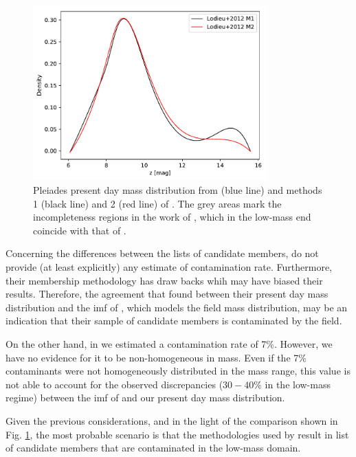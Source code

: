 \begin{figure}[ht!]
\begin{center}
\includegraphics[page=4,width=0.8\textwidth]{background/Figures/LodieuVsBouy.pdf}
\caption{Pleiades present day mass distribution from \citet{Bouy2015} (blue line) and methods 1 (black line) and 2 (red line) of \citet{Lodieu2012}. The grey areas mark the incompleteness regions in the work of \citet{Bouy2015}, which in the low-mass end coincide with that of \citet{Lodieu2012}.}
\label{fig:LodieuVsBouy}
\end{center}
\end{figure}

Concerning the differences between the lists of candidate members, \citet{Lodieu2012} do not provide (at least explicitly) any estimate of contamination rate. Furthermore, their membership methodology has draw backs \cite[see][]{Sarro2014} whih may have biased their results. Therefore, the agreement that \citet{Lodieu2012} found between their present day mass distribution and the \gls{imf} of \citet{Chabrier2005}, which models the field mass distribution, may be an indication that their sample of candidate members is contaminated by the field. 

On the other hand, in \citet{Bouy2015} we estimated a contamination rate of 7\%. However, we have no evidence for it to be non-homogeneous in mass. Even if the 7\% contaminants were not homogeneously distributed in the mass range, this value is not able to account for the observed discrepancies ($30-40\%$ in the low-mass regime) between the \gls{imf} of \citet{Chabrier2005} and our present day mass distribution.

Given the previous considerations, and in the light of the comparison shown in Fig. \ref{fig:LodieuVsBouy}, the most probable scenario is that the methodologies used by \citet{Lodieu2012} result in list of candidate members that are contaminated in the low-mass domain.

